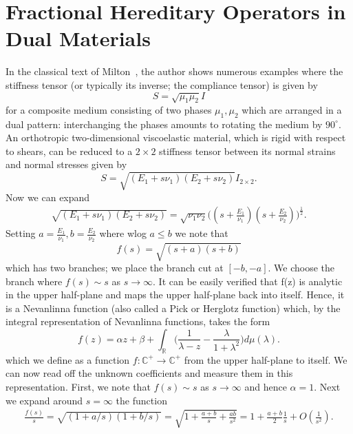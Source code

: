 \section{Fractional Hereditary Operators in Dual Materials}
In the classical text of Milton~\cite[Sec. 3.5 - 3.7]{milton2022theory}, the author shows numerous examples where the stiffness tensor (or typically its inverse; the compliance tensor) is given by
\begin{equation}
    S = \sqrt{\mu_1\mu_2}I
\end{equation}
for a composite medium consisting of two phases $\mu_1, \mu_2$ which are arranged in a dual pattern: interchanging the phases amounts to rotating the medium by $90^\circ$. An orthotropic two-dimensional viscoelastic material, which is rigid with respect to shears, can be reduced to a $2 \times 2$ stiffness tensor between its normal strains and normal stresses given by
\begin{equation}\label{eq:stiff}
    S = \sqrt{(E_1 + s\nu_1)(E_2 + s\nu_2)}I_{2 \times 2}.
\end{equation}
Now we can expand
\begin{align*}
    \sqrt{(E_1 + s\nu_1)(E_2 + s\nu_2)} = \sqrt{\nu_1\nu_2}\Big((s + \tfrac{E_1}{\nu_1})(s + \tfrac{E_2}{\nu_2})\Big)^\frac{1}{2}.
\end{align*}
Setting $a = \tfrac{E_1}{\nu_1}, b = \tfrac{E_2}{\nu_2}$ where wlog $a \leq b$ we note that
\begin{equation}
    f(s) = \sqrt{(s + a)(s + b)}
\end{equation}
which has two branches; we place the branch cut at $[-b, -a]$. We choose the branch where $f(s) \sim s$ as $s \to \infty$. It can be easily verified that f(z) is analytic in the upper half-plane and maps the upper half-plane back into itself. Hence, it is a Nevanlinna function (also called a Pick or Herglotz function) which, by the integral representation of Nevanlinna functions, takes the form
\begin{equation}
    f(z) = \alpha z + \beta + \int_\mathbb{R} \Big(\frac{1}{\lambda - z} - \frac{\lambda}{1 + \lambda^2}\Big)d\mu(\lambda).
\end{equation}
which we define as a function $f: \mathbb{C}^+ \to \mathbb{C}^+$ from the upper half-plane to itself. We can now read off the unknown coefficients and measure them in this representation. First, we note that $f(s) \sim s$ as $s \to \infty$ and hence $\alpha = 1$. Next we expand around $s = \infty$ the function
\begin{align*}
    \frac{f(s)}{s} = \sqrt{(1 + a/s)(1 + b/s)} = \sqrt{1 + \tfrac{a+b}{s} + \tfrac{ab}{s^2}} = 1 + \frac{a+b}{2}\frac{1}{s} + O(\tfrac{1}{s^2}).
\end{align*}
